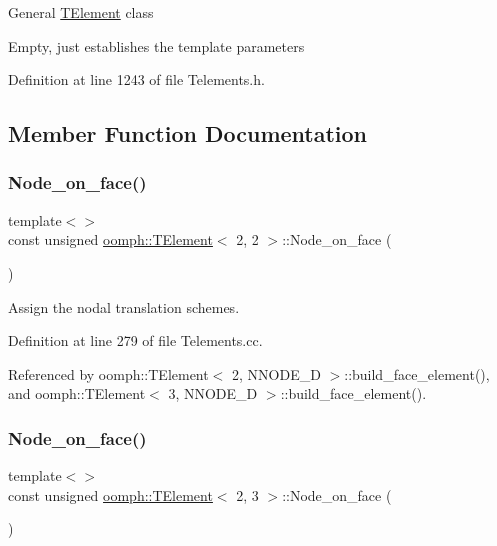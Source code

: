 General \hyperlink{classoomph_1_1TElement}{T\+Element} class

Empty, just establishes the template parameters 

Definition at line 1243 of file Telements.\+h.



\subsection{Member Function Documentation}
\mbox{\label{classoomph_1_1TElement_a2067d2c517603bbc041793a7200244f2}} 
\subsubsection{\texorpdfstring{Node\+\_\+on\+\_\+face()}{Node\_on\_face()}\hspace{0.1cm}{\footnotesize\ttfamily [1/5]}}
{\footnotesize\ttfamily template$<$$>$ \\
const unsigned \hyperlink{classoomph_1_1TElement}{oomph\+::\+T\+Element}$<$ 2, 2 $>$\+::Node\+\_\+on\+\_\+face (\begin{DoxyParamCaption}{ }\end{DoxyParamCaption})}



Assign the nodal translation schemes. 



Definition at line 279 of file Telements.\+cc.



Referenced by oomph\+::\+T\+Element$<$ 2, N\+N\+O\+D\+E\+\_\+D $>$\+::build\+\_\+face\+\_\+element(), and oomph\+::\+T\+Element$<$ 3, N\+N\+O\+D\+E\+\_\+D $>$\+::build\+\_\+face\+\_\+element().

\mbox{\label{classoomph_1_1TElement_ad5d1478661c226a7cbed31cba42b0ff3}} 
\subsubsection{\texorpdfstring{Node\+\_\+on\+\_\+face()}{Node\_on\_face()}\hspace{0.1cm}{\footnotesize\ttfamily [2/5]}}
{\footnotesize\ttfamily template$<$$>$ \\
const unsigned \hyperlink{classoomph_1_1TElement}{oomph\+::\+T\+Element}$<$ 2, 3 $>$\+::Node\+\_\+on\+\_\+face (\begin{DoxyParamCaption}{ }\end{DoxyParamCaption})}




